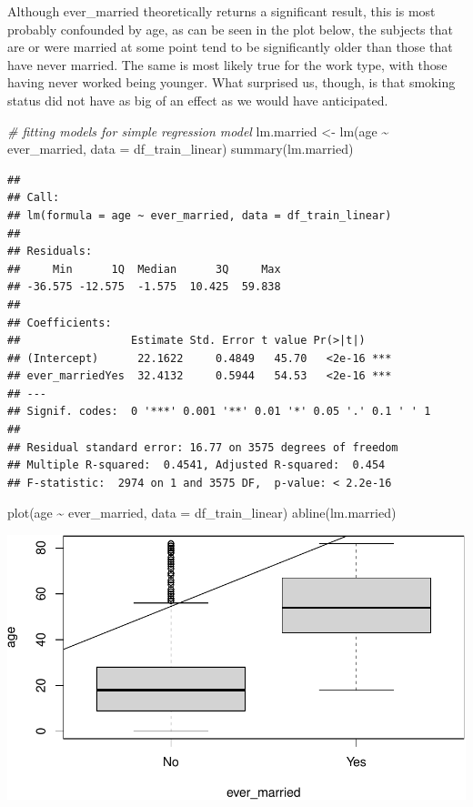 \documentclass[
]{article}
\newenvironment{Shaded}{\begin{snugshade}}{\end{snugshade}}
\newcommand{\AttributeTok}[1]{\textcolor[rgb]{0.77,0.63,0.00}{#1}}
\newcommand{\CommentTok}[1]{\textcolor[rgb]{0.56,0.35,0.01}{\textit{#1}}}
\newcommand{\FunctionTok}[1]{\textcolor[rgb]{0.00,0.00,0.00}{#1}}
\newcommand{\NormalTok}[1]{#1}
\newcommand{\OtherTok}[1]{\textcolor[rgb]{0.56,0.35,0.01}{#1}}
\newcommand{\SpecialCharTok}[1]{\textcolor[rgb]{0.00,0.00,0.00}{#1}}
\renewcommand{\=}[1]{\stackrel{#1}{=}}
\theoremstyle{definition}
\theoremstyle{remark}
\begin{document}
Although ever\_married theoretically returns a significant result, this is most probably confounded by age, as can be seen in the plot below, the subjects that are or were married at some point tend to be significantly older than those that have never married.
The same is most likely true for the work type, with those having never worked being younger. What surprised us, though, is that smoking status did not have as big of an effect as we would have anticipated.

\begin{Shaded}
\begin{Highlighting}[]
\CommentTok{\# fitting models for simple regression model}
\NormalTok{lm.married }\OtherTok{\textless{}{-}} \FunctionTok{lm}\NormalTok{(age }\SpecialCharTok{\textasciitilde{}}\NormalTok{ ever\_married, }\AttributeTok{data =}\NormalTok{ df\_train\_linear)}
\FunctionTok{summary}\NormalTok{(lm.married)}
\end{Highlighting}
\end{Shaded}

\begin{verbatim}
## 
## Call:
## lm(formula = age ~ ever_married, data = df_train_linear)
## 
## Residuals:
##     Min      1Q  Median      3Q     Max 
## -36.575 -12.575  -1.575  10.425  59.838 
## 
## Coefficients:
##                 Estimate Std. Error t value Pr(>|t|)    
## (Intercept)      22.1622     0.4849   45.70   <2e-16 ***
## ever_marriedYes  32.4132     0.5944   54.53   <2e-16 ***
## ---
## Signif. codes:  0 '***' 0.001 '**' 0.01 '*' 0.05 '.' 0.1 ' ' 1
## 
## Residual standard error: 16.77 on 3575 degrees of freedom
## Multiple R-squared:  0.4541, Adjusted R-squared:  0.454 
## F-statistic:  2974 on 1 and 3575 DF,  p-value: < 2.2e-16
\end{verbatim}

\begin{Shaded}
\begin{Highlighting}[]
\FunctionTok{plot}\NormalTok{(age }\SpecialCharTok{\textasciitilde{}}\NormalTok{ ever\_married, }\AttributeTok{data =}\NormalTok{ df\_train\_linear)}
\FunctionTok{abline}\NormalTok{(lm.married)}
\end{Highlighting}
\end{Shaded}

\includegraphics{sioux_mach_learn_project_files/figure-latex/unnamed-chunk-29-1.pdf}
\end{document}

